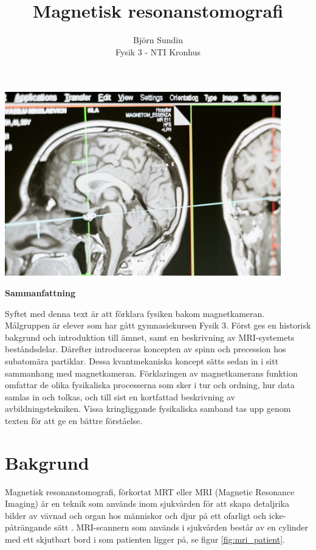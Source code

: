 \documentclass[11pt, a4paper]{article}
\title{Magnetisk resonanstomografi}
\author{Björn Sundin\medskip\\\normalsize Fysik 3 - NTI Kronhus}
\begin{document}
\maketitle

\vfill
\begin{center}
	\includegraphics[width=0.9\textwidth]{mri_scan.jpg}	
\end{center}
\vspace{1cm}
\vfill

\clearpage
\begin{center}
	\textbf{Sammanfattning}
\end{center}

Syftet med denna text är att förklara fysiken bakom magnetkameran. Målgruppen är elever som har gått gymnasiekursen Fysik 3. Först ges en historisk bakgrund och introduktion till ämnet, samt en beskrivning av MRI-systemets beståndsdelar. Därefter introduceras koncepten av spinn och precession hos subatomära partiklar. Dessa kvantmekaniska koncept sätts sedan in i sitt sammanhang med magnetkameran. Förklaringen av magnetkamerans funktion omfattar de olika fysikaliska processerna som sker i tur och ordning, hur data samlas in och tolkas, och till sist en kortfattad beskrivning av avbildningstekniken. Vissa kringliggande fysikaliska samband tas upp genom texten för att ge en bättre förståelse.
\vspace{0.5cm}
\tableofcontents

\clearpage
\section{Bakgrund}

Magnetisk resonanstomografi, förkortat MRT eller MRI (Magnetic Resonance Imaging) är en teknik som används inom sjukvården för att skapa detaljrika bilder av vävnad och organ hos människor och djur på ett ofarligt och icke-påträngande sätt \parencite{mri_nobelpris_pressmeddelande}. MRI-scannern som används i sjukvården består av en cylinder med ett skjutbart bord i som patienten ligger på, se figur \ref{fig:mri_patient}. 
\end{document}
